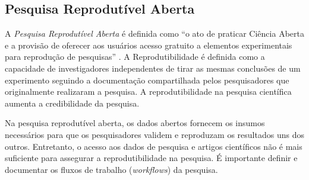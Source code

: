 \begin{comment}

A Revisão por Pares Aberta (\textit{Open Peer Review}) é um processo de validação por pares realizado abertamente na Internet, em que alguns aspectos do processo de revisão são abertos à comunidade de pesquisa ou ao público. Os manuscritos são disponibilizados pelos autores imediatamente antes dos procedimentos formais de revisão por pares. 
No processo, autores e revisores estão cientes da identidade um do outro e os relatórios de revisão são abertos e acessíveis e são publicados juntamente com o artigo disponibilizado. Uma entidade organizacional diferente do local de publicação dá suporte ao processo de revisão.
A comunidade em geral pode contribuir para o processo de revisão (pesquisadores ou o público em geral).
\end{comment}

\subsection{Pesquisa Reprodutível Aberta}

A \textit{Pesquisa Reprodutível Aberta} é definida como ``o ato de praticar Ciência Aberta e a provisão de oferecer aos usuários acesso gratuito a elementos experimentais para reprodução de pesquisas'' \cite{training:handbook}.
%
A Reprodutibilidade é definida como a capacidade de investigadores independentes de tirar as mesmas conclusões de um experimento seguindo a documentação compartilhada pelos pesquisadores que originalmente realizaram a pesquisa.
A reprodutibilidade na pesquisa científica aumenta a credibilidade da pesquisa.

Na pesquisa reprodutível aberta, os dados abertos fornecem os insumos necessários para que os pesquisadores validem e reproduzam os resultados uns dos outros. 
Entretanto, o acesso aos dados de pesquisa e artigos científicos não é mais suficiente para assegurar a reprodutibilidade na pesquisa. 
É importante definir e documentar os fluxos de trabalho (\textit{workflows}) da pesquisa.

